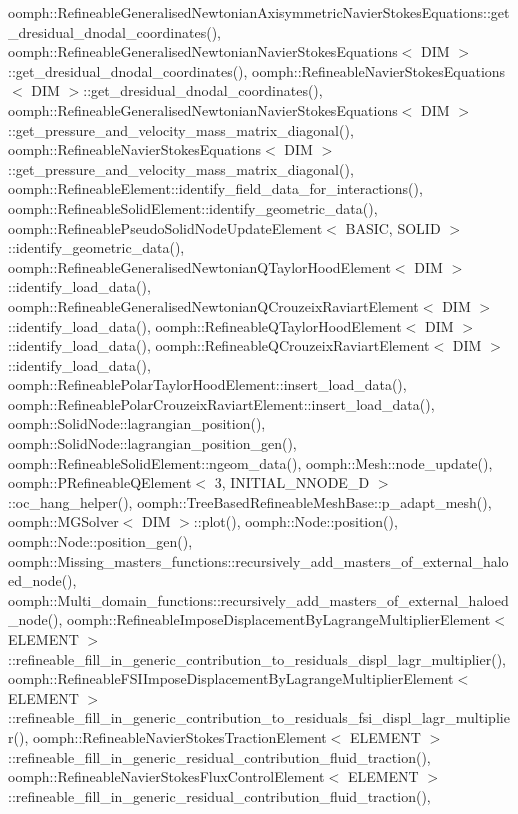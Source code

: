 oomph\+::\+Refineable\+Generalised\+Newtonian\+Axisymmetric\+Navier\+Stokes\+Equations\+::get\+\_\+dresidual\+\_\+dnodal\+\_\+coordinates(), oomph\+::\+Refineable\+Generalised\+Newtonian\+Navier\+Stokes\+Equations$<$ D\+I\+M $>$\+::get\+\_\+dresidual\+\_\+dnodal\+\_\+coordinates(), oomph\+::\+Refineable\+Navier\+Stokes\+Equations$<$ D\+I\+M $>$\+::get\+\_\+dresidual\+\_\+dnodal\+\_\+coordinates(), oomph\+::\+Refineable\+Generalised\+Newtonian\+Navier\+Stokes\+Equations$<$ D\+I\+M $>$\+::get\+\_\+pressure\+\_\+and\+\_\+velocity\+\_\+mass\+\_\+matrix\+\_\+diagonal(), oomph\+::\+Refineable\+Navier\+Stokes\+Equations$<$ D\+I\+M $>$\+::get\+\_\+pressure\+\_\+and\+\_\+velocity\+\_\+mass\+\_\+matrix\+\_\+diagonal(), oomph\+::\+Refineable\+Element\+::identify\+\_\+field\+\_\+data\+\_\+for\+\_\+interactions(), oomph\+::\+Refineable\+Solid\+Element\+::identify\+\_\+geometric\+\_\+data(), oomph\+::\+Refineable\+Pseudo\+Solid\+Node\+Update\+Element$<$ B\+A\+S\+I\+C, S\+O\+L\+I\+D $>$\+::identify\+\_\+geometric\+\_\+data(), oomph\+::\+Refineable\+Generalised\+Newtonian\+Q\+Taylor\+Hood\+Element$<$ D\+I\+M $>$\+::identify\+\_\+load\+\_\+data(), oomph\+::\+Refineable\+Generalised\+Newtonian\+Q\+Crouzeix\+Raviart\+Element$<$ D\+I\+M $>$\+::identify\+\_\+load\+\_\+data(), oomph\+::\+Refineable\+Q\+Taylor\+Hood\+Element$<$ D\+I\+M $>$\+::identify\+\_\+load\+\_\+data(), oomph\+::\+Refineable\+Q\+Crouzeix\+Raviart\+Element$<$ D\+I\+M $>$\+::identify\+\_\+load\+\_\+data(), oomph\+::\+Refineable\+Polar\+Taylor\+Hood\+Element\+::insert\+\_\+load\+\_\+data(), oomph\+::\+Refineable\+Polar\+Crouzeix\+Raviart\+Element\+::insert\+\_\+load\+\_\+data(), oomph\+::\+Solid\+Node\+::lagrangian\+\_\+position(), oomph\+::\+Solid\+Node\+::lagrangian\+\_\+position\+\_\+gen(), oomph\+::\+Refineable\+Solid\+Element\+::ngeom\+\_\+data(), oomph\+::\+Mesh\+::node\+\_\+update(), oomph\+::\+P\+Refineable\+Q\+Element$<$ 3, I\+N\+I\+T\+I\+A\+L\+\_\+\+N\+N\+O\+D\+E\+\_\+D $>$\+::oc\+\_\+hang\+\_\+helper(), oomph\+::\+Tree\+Based\+Refineable\+Mesh\+Base\+::p\+\_\+adapt\+\_\+mesh(), oomph\+::\+M\+G\+Solver$<$ D\+I\+M $>$\+::plot(), oomph\+::\+Node\+::position(), oomph\+::\+Node\+::position\+\_\+gen(), oomph\+::\+Missing\+\_\+masters\+\_\+functions\+::recursively\+\_\+add\+\_\+masters\+\_\+of\+\_\+external\+\_\+haloed\+\_\+node(), oomph\+::\+Multi\+\_\+domain\+\_\+functions\+::recursively\+\_\+add\+\_\+masters\+\_\+of\+\_\+external\+\_\+haloed\+\_\+node(), oomph\+::\+Refineable\+Impose\+Displacement\+By\+Lagrange\+Multiplier\+Element$<$ E\+L\+E\+M\+E\+N\+T $>$\+::refineable\+\_\+fill\+\_\+in\+\_\+generic\+\_\+contribution\+\_\+to\+\_\+residuals\+\_\+displ\+\_\+lagr\+\_\+multiplier(), oomph\+::\+Refineable\+F\+S\+I\+Impose\+Displacement\+By\+Lagrange\+Multiplier\+Element$<$ E\+L\+E\+M\+E\+N\+T $>$\+::refineable\+\_\+fill\+\_\+in\+\_\+generic\+\_\+contribution\+\_\+to\+\_\+residuals\+\_\+fsi\+\_\+displ\+\_\+lagr\+\_\+multiplier(), oomph\+::\+Refineable\+Navier\+Stokes\+Traction\+Element$<$ E\+L\+E\+M\+E\+N\+T $>$\+::refineable\+\_\+fill\+\_\+in\+\_\+generic\+\_\+residual\+\_\+contribution\+\_\+fluid\+\_\+traction(), oomph\+::\+Refineable\+Navier\+Stokes\+Flux\+Control\+Element$<$ E\+L\+E\+M\+E\+N\+T $>$\+::refineable\+\_\+fill\+\_\+in\+\_\+generic\+\_\+residual\+\_\+contribution\+\_\+fluid\+\_\+traction(), 